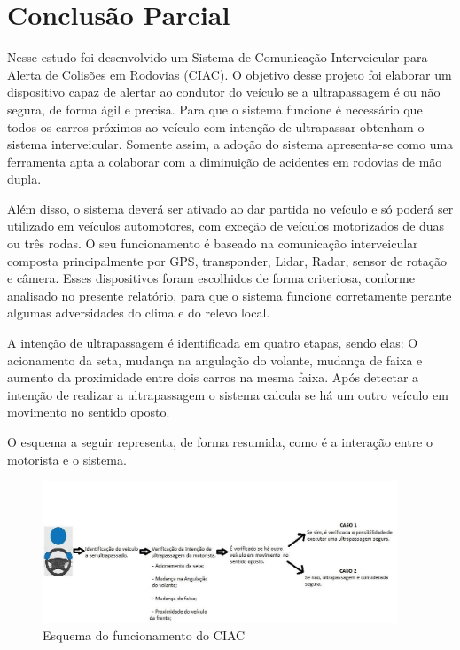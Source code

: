 \chapter[Conclusão Parcial]{Conclusão Parcial}

Nesse estudo foi desenvolvido um Sistema de Comunicação Interveicular para Alerta
de Colisões em Rodovias (CIAC). O objetivo desse projeto foi elaborar um dispositivo
capaz de alertar ao condutor do veículo se a ultrapassagem é ou não segura, de
forma ágil e precisa. Para que o sistema funcione é necessário que todos os
carros próximos ao veículo com intenção de ultrapassar obtenham o sistema
interveicular. Somente assim, a adoção do sistema apresenta-se como uma
ferramenta apta a colaborar com a diminuição de acidentes em rodovias de
mão dupla.

Além disso, o sistema deverá ser ativado ao dar partida no veículo e só
 poderá ser utilizado em veículos automotores, com exceção de veículos
 motorizados de duas ou três rodas. O seu funcionamento é baseado na
 comunicação interveicular composta principalmente por GPS, transponder,
 Lidar, Radar, sensor de rotação e câmera. Esses dispositivos foram escolhidos
 de forma criteriosa, conforme analisado no presente relatório, para que o
 sistema funcione corretamente perante algumas adversidades do clima e do
 relevo local.

A intenção de ultrapassagem é identificada em quatro etapas, sendo elas: O
acionamento da seta, mudança na angulação do volante, mudança de faixa e aumento
da proximidade entre dois carros na mesma faixa. Após detectar a intenção de
realizar a ultrapassagem o sistema calcula se há um outro veículo em movimento
no sentido oposto.

O esquema a seguir representa, de forma resumida, como é a interação entre o
motorista e o sistema.

\begin{figure}[h]
  \centering
  \includegraphics[width=400px, scale=1]{figuras/funcionamentociac}
  \caption{Esquema do funcionamento do CIAC}
\label{fig:funcionamentociac}
\end{figure}

